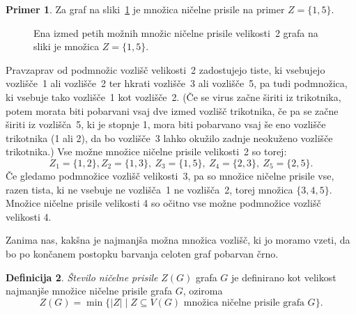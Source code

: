 \documentclass[12pt,a4paper,twoside]{article}
\theoremstyle{definition} %
\newtheorem{definicija}{Definicija}[section]
\newtheorem{primer}[definicija]{Primer}
\theoremstyle{plain} %
\numberwithin{equation}{section}  %
\begin{document}
\begin{primer}
    \label{prim:osnovni-zf}
    Za graf na sliki~\ref{fig:osnovni-primer-prisile} je množica ničelne prisile na primer $Z = \{ 1, 5\}$. 
    \begin{figure}[h]
        \centering
        \caption{Ena izmed petih možnih množic ničelne prisile velikosti~2 grafa na sliki je množica $Z =\{1,5\}$.}
        \label{fig:osnovni-primer-prisile}
    \end{figure}
    Pravzaprav od podmnožic vozlišč velikosti~2 zadostujejo tiste, ki vsebujejo vozlišče~1 ali vozlišče~2 ter hkrati vozlišče~3 ali vozlišče~5, pa tudi podmnožica, ki vsebuje tako vozlišče~1 kot vozlišče~2. (Če se virus začne širiti iz trikotnika, potem morata biti pobarvani vsaj dve izmed vozlišč trikotnika, če pa se začne širiti iz vozlišča~5, ki je stopnje 1, mora biti pobarvano vsaj še eno vozlišče trikotnika (1 ali 2), da bo vozlišče~3 lahko okužilo zadnje neokuženo vozlišče trikotnika.) Vse možne množice ničelne prisile velikosti~2 so torej:
    \[ Z_1 = \{ 1, 2\}, Z_2 = \{ 1, 3\},\ Z_3 = \{ 1, 5\},\ Z_4 = \{ 2, 3\},\ Z_5 = \{2, 5\}. \]
    Če gledamo podmnožice vozlišč velikosti~3, pa so množice ničelne prisile vse, razen tista, ki ne vsebuje ne vozlišča~1 ne vozlišča~2, torej množica $\{3, 4, 5\}$. Množice ničelne prisile velikosti 4 so očitno vse možne podmnožice vozlišč velikosti 4.
\end{primer}

Zanima nas, kakšna je najmanjša možna množica vozlišč, ki jo moramo vzeti, da bo po končanem postopku barvanja celoten graf pobarvan črno. 

\begin{definicija}
    \emph{Število ničelne prisile} $Z(G)$ grafa $G$ je definirano kot velikost najmanjše množice ničelne prisile grafa $G$, oziroma
    \[ Z(G) = \min \{|Z| \mid Z \subseteq V(G) \text{ množica ničelne prisile grafa } G \}. \]
\end{definicija}
\end{document}
